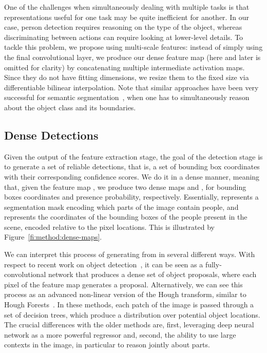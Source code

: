 \documentclass[10pt,twocolumn,letterpaper]{article}
\begin{document}
One of the challenges when simultaneously dealing with multiple tasks
is that representations useful for one task may be quite inefficient for another. 
In our case, person detection requires
reasoning on the type of the object, whereas discriminating between actions can
require looking at lower-level details. To tackle this problem, we propose
using multi-scale features: instead of simply using the final convolutional
layer, we produce our dense feature map  (here and later
 is omitted for clarity) by concatenating multiple intermediate activation
maps. Since they do not have fitting dimensions, we resize them to the fixed
size  via differentiable bilinear interpolation. 
Note that similar approaches have been very successful for semantic
segmentation~\cite{Long2015,   Hariharan2015}, when one has to simultaneously
reason about the object class and its boundaries.



\subsection{Dense Detections}
\vspace{-0.15cm}

Given the output of the feature extraction stage, the goal of the detection
stage is to generate a set of reliable detections, that is, a set of
bounding box coordinates with their corresponding confidence scores. We do it in
a dense manner, meaning that, given the feature map ,
we produce two dense maps  and ,
for bounding boxes coordinates and presence probability,
respectively. Essentially,  represents a segmentation mask encoding
which parts of the image contain people, and 
represents the coordinates of the bounding boxes of the people present in the
scene, encoded relative to the pixel locations. This is illustrated by
Figure~\ref{fi:method:dense-maps}. 

We can interpret this
process of generating  from  in several different ways. With
respect to recent work on object
detection~\cite{Girshick2015,Redmon2016,Ren2015}, it can be seen as a
fully-convolutional network that produces a dense set of object proposals, where
each pixel of the feature map  generates a proposal. Alternatively, we
can see this process as an advanced non-linear version of the Hough transform,
similar to Hough Forests~\cite{Gall2011, Barinova2012}. In these methods, each
patch of the image is passed through a set of decision trees, which produce a
distribution over potential object locations. The crucial differences with the
older methods are, first, leveraging deep neural network as a more powerful 
regressor and, second, the ability to use large contexts in the image, in 
particular to reason jointly about parts. 
\end{document}
